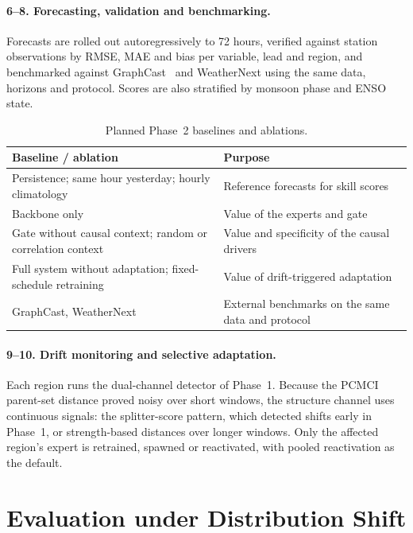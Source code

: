 \paragraph{6--8. Forecasting, validation and benchmarking.} Forecasts are rolled out autoregressively to 72 hours, verified against station observations by RMSE, MAE and bias per variable, lead and region, and benchmarked against GraphCast~\cite{lam2023learning} and WeatherNext using the same data, horizons and protocol. Scores are also stratified by monsoon phase and ENSO state.

\begin{table}[htbp]
\centering
\caption{Planned Phase~2 baselines and ablations.}
\label{tab:p2-baselines}
\footnotesize
\renewcommand{\arraystretch}{1.15}
\begin{tabularx}{\textwidth}{>{\raggedright\arraybackslash}p{5.2cm}>{\raggedright\arraybackslash}X}
\toprule
\textbf{Baseline / ablation} & \textbf{Purpose} \\
\midrule
Persistence; same hour yesterday; hourly climatology & Reference forecasts for skill scores \\
Backbone only & Value of the experts and gate \\
Gate without causal context; random or correlation context & Value and specificity of the causal drivers \\
Full system without adaptation; fixed-schedule retraining & Value of drift-triggered adaptation \\
GraphCast, WeatherNext & External benchmarks on the same data and protocol \\
\bottomrule
\end{tabularx}
\end{table}

\paragraph{9--10. Drift monitoring and selective adaptation.} Each region runs the dual-channel detector of Phase~1. Because the PCMCI parent-set distance proved noisy over short windows, the structure channel uses continuous signals: the splitter-score pattern, which detected shifts early in Phase~1, or strength-based distances over longer windows. Only the affected region's expert is retrained, spawned or reactivated, with pooled reactivation as the default.

\section{Evaluation under Distribution Shift}
\label{sec:p2-eval}

